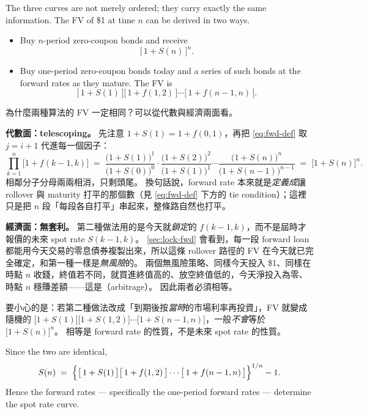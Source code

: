 
The three curves are not merely ordered; they carry exactly the same information.
The FV of \$1 at time $n$ can be derived in two ways.

\begin{itemize}[itemsep=0.35em]
	\item Buy $n$-period zero-coupon bonds and receive
	      \[
		      \bigl[\,1+S(n)\,\bigr]^{n} .
	      \]
	\item Buy one-period zero-coupon bonds today and a series of such bonds at the forward rates as they mature.
	      The FV is
	      \[
		      \bigl[\,1+S(1)\,\bigr]\bigl[\,1+f(1,2)\,\bigr]\cdots\bigl[\,1+f(n-1,n)\,\bigr] .
	      \]
\end{itemize}

\suppstart
\begin{remark}
	為什麼兩種算法的 FV 一定相同？可以從代數與經濟兩面看。

	\textbf{代數面：telescoping。}
	先注意 $1+S(1)=1+f(0,1)$，再把 \eqref{eq:fwd-def} 取 $j=i+1$ 代進每一個因子：
	\[
		\prod_{k=1}^{n}\bigl[1+f(k-1,k)\bigr]
		\;=\; \frac{\bigl(1+S(1)\bigr)^{1}}{\bigl(1+S(0)\bigr)^{0}}\cdot
		\frac{\bigl(1+S(2)\bigr)^{2}}{\bigl(1+S(1)\bigr)^{1}}\cdots
		\frac{\bigl(1+S(n)\bigr)^{n}}{\bigl(1+S(n-1)\bigr)^{n-1}}
		\;=\; \bigl[1+S(n)\bigr]^{n} .
	\]
	相鄰分子分母兩兩相消，只剩頭尾。
	換句話說，forward rate 本來就是\emph{定義成}讓 rollover 與 maturity 打平的那個數（見 \eqref{eq:fwd-def} 下方的 tie condition）；這裡只是把 $n$ 段「每段各自打平」串起來，整條路自然也打平。

	\textbf{經濟面：無套利。}
	第二種做法用的是今天就\emph{鎖定}的 $f(k-1,k)$，而不是屆時才報價的未來 spot rate $S(k-1,k)$。
	\autoref{sec:lock-fwd} 會看到，每一段 forward loan 都能用今天交易的零息債券複製出來，所以這條 rollover 路徑的 FV 在今天就已完全確定，和第一種一樣是\emph{無風險}的。
	兩個無風險策略、同樣今天投入 \$1、同樣在時點 $n$ 收錢，終值若不同，就買進終值高的、放空終值低的，今天淨投入為零、時點 $n$ 穩賺差額——這是（arbitrage）。
	因此兩者必須相等。

	要小心的是：若第二種做法改成「到期後按\emph{當時}的市場利率再投資」，FV 就變成隨機的 $\bigl[1+S(1)\bigr]\bigl[1+S(1,2)\bigr]\cdots\bigl[1+S(n-1,n)\bigr]$，一般\emph{不會}等於 $\bigl[1+S(n)\bigr]^{n}$。
	相等是 forward rate 的性質，不是未來 spot rate 的性質。
\end{remark}
\suppend


\begin{theorem}
	Since the two are identical,
	\begin{equation}
		S(n) \;=\; \Bigl\{\bigl[\,1+S(1)\,\bigr]\bigl[\,1+f(1,2)\,\bigr]\cdots\bigl[\,1+f(n-1,n)\,\bigr]\Bigr\}^{1/n} - 1 . \label{eq:fwd-spot-prod}
	\end{equation}
	Hence the forward rates --- specifically the one-period forward rates --- determine the spot rate curve.
\end{theorem}

